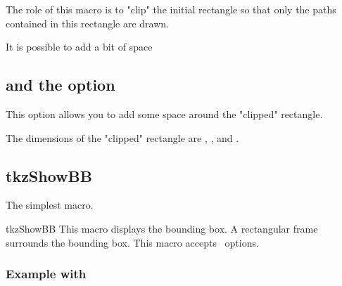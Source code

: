 The role of this macro is to "clip" the initial rectangle so that only the paths contained in this rectangle are drawn.

\begin{tkzexample}[latex=8cm,small]
\end{tkzexample} 

It is possible to add a bit of space
\begin{tkzltxexample}[]
  \tkzClip[space=1]
\end{tkzltxexample} 

\subsection{ and the option } 
This option allows you to add some space around the "clipped" rectangle.
\begin{tkzexample}[latex=8cm,small]
\end{tkzexample}   
The dimensions of the "clipped" rectangle are , ,  and . 

\subsection{tkzShowBB}
The simplest macro. 
\begin{NewMacroBox}{tkzShowBB}{}%
This macro displays the bounding box. A rectangular frame surrounds the bounding box. This macro accepts \TIKZ\ options.
\end{NewMacroBox} 

\subsubsection{Example with }
\begin{tkzexample}[latex=8cm,small]
\end{tkzexample}
